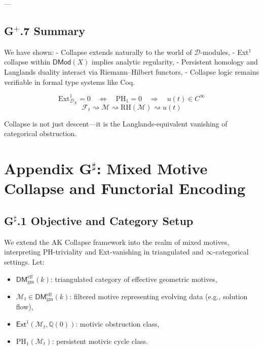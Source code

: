 \documentclass[11pt]{article}
\begin{document}
---

\subsection*{G$^+$.7 Summary}

We have shown:
- Collapse extends naturally to the world of $\mathcal{D}$-modules,
- Ext$^1$ collapse within $\mathsf{DMod}(X)$ implies analytic regularity,
- Persistent homology and Langlands duality interact via Riemann–Hilbert functors,
- Collapse logic remains verifiable in formal type systems like Coq.

\[
\boxed{
\mathrm{Ext}^1_{\mathcal{D}_X} = 0 \quad \Leftrightarrow \quad \mathrm{PH}_1 = 0 \quad \Rightarrow \quad u(t) \in C^\infty
}
\]
\[
\boxed{
\mathcal{F}_t \rightsquigarrow \mathcal{M} \rightsquigarrow \text{RH}(\mathcal{M}) \rightsquigarrow u(t)
}
\]

Collapse is not just descent—it is the Langlands-equivalent vanishing of categorical obstruction.



\section*{Appendix G$^\sharp$: Mixed Motive Collapse and Functorial Encoding}

\subsection*{G$^\sharp$.1 Objective and Category Setup}

We extend the AK Collapse framework into the realm of mixed motives, interpreting PH-triviality and Ext-vanishing  
in triangulated and $\infty$-categorical settings. Let:
\begin{itemize}
  \item \( \mathsf{DM}^{\mathrm{eff}}_{\mathrm{gm}}(k) \): triangulated category of effective geometric motives,
  \item \( \mathcal{M}_t \in \mathsf{DM}^{\mathrm{eff}}_{\mathrm{gm}}(k) \): filtered motive representing evolving data (e.g., solution flow),
  \item \( \mathsf{Ext}^1(\mathcal{M}_t, \mathbb{Q}(0)) \): motivic obstruction class,
  \item \( \mathrm{PH}_1(\mathcal{M}_t) \): persistent motivic cycle class.
\end{itemize}
\end{document}
